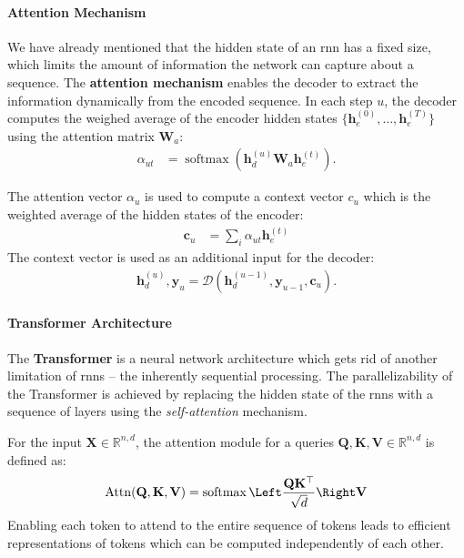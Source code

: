\paragraph{Attention Mechanism} We have already mentioned that the hidden state of an \ac{rnn} has a fixed size, which limits the amount of information the network can capture about a sequence. The \textbf{attention mechanism} \cite{bahdanau2015neural} enables the decoder to extract the information dynamically from the encoded sequence. In each step $u$, the decoder computes the weighed average of the encoder hidden states $\{\mathbf{h}_e^{(0)}, \ldots, \mathbf{h}_e^{(T)}\}$ using the attention matrix $\mathbf{W}_a$:
\begin{align}
    \alpha_{ut} & = \operatorname{softmax}(\mathbf{h}_d^{(u)}\mathbf{W}_a \mathbf{h}_e^{(t)}).
\end{align}

The attention vector $\alpha_u$ is used to compute a context vector $c_u$ which is the weighted average of the hidden states of the encoder:
\begin{align}
    \mathbf{c}_u & = \sum_i \alpha_{ut} \mathbf{h}_e^{(t)}
\end{align}
The context vector is used as an additional input for the decoder:
\begin{align}
    \mathbf{h}_d^{(u)}, \mathbf{y}_u = \mathcal{D}(\mathbf{h}_d^{(u-1)}, \mathbf{y}_{u-1}, \mathbf{c}_u).
\end{align}



\paragraph{Transformer Architecture} The \textbf{Transformer} \cite{vaswani2017attention} is a neural network architecture which gets rid of another limitation of \acp{rnn} -- the inherently sequential processing. The  parallelizability of the Transformer is achieved by replacing the hidden state of the \acp{rnn} with a sequence of layers using the \emph{self-attention} mechanism.

For the input $\mathbf{X} \in \mathbb{R}^{n,d}$, the attention module for a queries $\mathbf{Q}, \mathbf{K}, \mathbf{V} \in \mathbb{R}^{n,d}$ is defined as:
\begin{align}
    \operatorname{Attn}(\mathbf{Q}, \mathbf{K}, \mathbf{V}) = \operatorname{softmax}\Left\frac{\mathbf{Q}\mathbf{K}^\top}{\sqrt{d}}\Right\mathbf{V}
\end{align}
Enabling each token to attend to the entire sequence of tokens leads to efficient representations of tokens which can be computed independently of each other.

